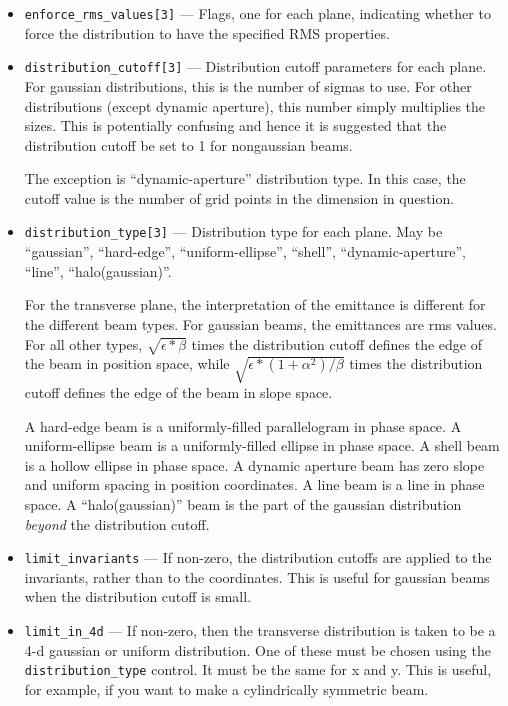 \documentclass[11pt]{article}
\begin{document}
\begin{itemize}
\item \verb|enforce_rms_values[3]| --- Flags, one for each plane,
indicating whether to force the distribution to have the specified RMS
properties.

\item \verb|distribution_cutoff[3]| --- Distribution cutoff parameters
for each plane.  For gaussian distributions, this is the number of
sigmas to use.  For other distributions (except dynamic aperture),
this number simply multiplies the sizes.  This is potentially
confusing and hence it is suggested that the distribution cutoff be
set to 1 for nongaussian beams.

The exception is ``dynamic-aperture'' distribution type.  In this case,
the cutoff value is the number of grid points in the dimension in question.

\item \verb|distribution_type[3]| --- Distribution type for each
plane.  May be ``gaussian'', ``hard-edge'', ``uniform-ellipse'',
``shell'', ``dynamic-aperture'', ``line'', ``halo(gaussian)''.

For the transverse plane, the interpretation of the emittance is
different for the different beam types.  For gaussian beams, the
emittances are rms values.  For all other types, $\sqrt{\epsilon*\beta}$
times the distribution cutoff defines the edge of the beam in position
space, while $\sqrt{\epsilon*(1+\alpha^2)/\beta}$ times the distribution
cutoff defines the edge of the beam in slope space.  

A hard-edge beam is a uniformly-filled parallelogram in phase space.
A uniform-ellipse beam is a uniformly-filled ellipse in phase space.
A shell beam is a hollow ellipse in phase space.  A dynamic aperture
beam has zero slope and uniform spacing in position coordinates.  A
line beam is a line in phase space.  A ``halo(gaussian)'' beam is
the part of the gaussian distribution {\em beyond} the distribution cutoff.

\item \verb|limit_invariants| --- If non-zero, the distribution
cutoffs are applied to the invariants, rather than to the coordinates.
This is useful for gaussian beams when the distribution cutoff is
small.

\item \verb|limit_in_4d| --- If non-zero, then the transverse
distribution is taken to be a 4-d gaussian or uniform distribution.
One of these must be chosen using the \verb|distribution_type|
control.  It must be the same for x and y.  This is useful, for
example, if you want to make a cylindrically symmetric beam.


\end{itemize}
\end{document}
